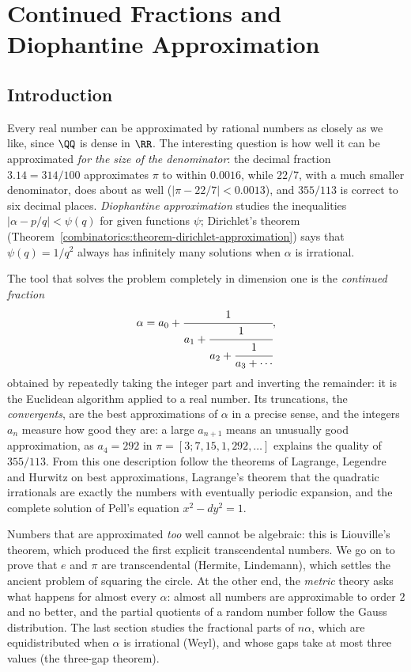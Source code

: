 \chapter{Continued Fractions and Diophantine Approximation}\label{continued-fractions}

\section{Introduction}\label{continued-fractions:section-introduction}

Every real number can be approximated by rational numbers as closely as we like, since $\QQ$ is dense in $\RR$. The interesting question is how well it can be approximated \emph{for the size of the
denominator}: the decimal fraction $3.14 = 314/100$ approximates $\pi$ to within $0.0016$, while $22/7$, with a much smaller denominator, does about as well ($|\pi - 22/7| < 0.0013$), and $355/113$
is correct to six decimal places. \emph{Diophantine approximation} studies the inequalities $|\alpha - p/q| < \psi(q)$ for given functions $\psi$; Dirichlet's theorem
(Theorem~\ref{combinatorics:theorem-dirichlet-approximation}) says that $\psi(q) = 1/q^2$ always has infinitely many solutions when $\alpha$ is irrational.

The tool that solves the problem completely in dimension one is the \emph{continued fraction}
\[
\alpha = a_0 + \cfrac{1}{a_1 + \cfrac{1}{a_2 + \cfrac{1}{a_3 + \cdots}}},
\]
obtained by repeatedly taking the integer part and inverting the remainder: it is the Euclidean algorithm applied to a real number. Its truncations, the \emph{convergents}, are the best
approximations of $\alpha$ in a precise sense, and the integers $a_n$ measure how good they are: a large $a_{n+1}$ means an unusually good approximation, as $a_4 = 292$ in
$\pi = [3; 7, 15, 1, 292, \ldots]$ explains the quality of $355/113$. From this one description follow the theorems of Lagrange, Legendre and Hurwitz on best approximations, Lagrange's theorem that
the quadratic irrationals are exactly the numbers with eventually periodic expansion, and the complete solution of Pell's equation $x^2 - dy^2 = 1$.

Numbers that are approximated \emph{too} well cannot be algebraic: this is Liouville's theorem, which produced the first explicit transcendental numbers. We go on to prove that $e$ and $\pi$ are
transcendental (Hermite, Lindemann), which settles the ancient problem of squaring the circle. At the other end, the \emph{metric} theory asks what happens for almost every $\alpha$: almost all
numbers are approximable to order $2$ and no better, and the partial quotients of a random number follow the Gauss distribution. The last section studies the fractional parts of $n\alpha$, which
are equidistributed when $\alpha$ is irrational (Weyl), and whose gaps take at most three values (the three-gap theorem).

